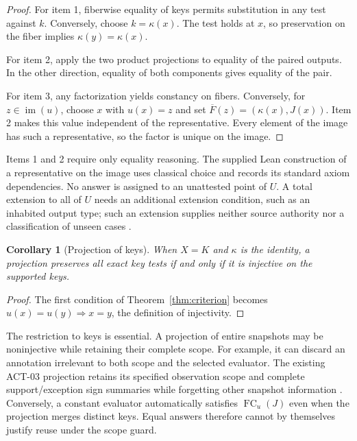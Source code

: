 \documentclass[11pt]{article}
\newtheorem{corollary}[theorem]{Corollary}
\newcommand{\FC}{\operatorname{FC}}
\newcommand{\im}{\operatorname{im}}
\begin{document}
\begin{proof}
For item 1, fiberwise equality of keys permits substitution in any test against \(k\). Conversely, choose \(k=\kappa(x)\). The test holds at \(x\), so preservation on the fiber implies \(\kappa(y)=\kappa(x)\).

For item 2, apply the two product projections to equality of the paired outputs. In the other direction, equality of both components gives equality of the pair.

For item 3, any factorization yields constancy on fibers. Conversely, for \(z\in\im(u)\), choose \(x\) with \(u(x)=z\) and set \(\overline F(z)=(\kappa(x),J(x))\). Item 2 makes this value independent of the representative. Every element of the image has such a representative, so the factor is unique on the image.
\end{proof}

Items 1 and 2 require only equality reasoning. The supplied Lean construction of a representative on the image uses classical choice and records its standard axiom dependencies. No answer is assigned to an unattested point of \(U\). A total extension to all of \(U\) needs an additional extension condition, such as an inhabited output type; such an extension supplies neither source authority nor a classification of unseen cases \cite{factor}.

\begin{corollary}[Projection of keys]\label{cor:keys}
When \(X=K\) and \(\kappa\) is the identity, a projection preserves all exact key tests if and only if it is injective on the supported keys.
\end{corollary}

\begin{proof}
The first condition of Theorem~\ref{thm:criterion} becomes
\(u(x)=u(y)\Rightarrow x=y\), the definition of injectivity.
\end{proof}

The restriction to keys is essential. A projection of entire snapshots may be noninjective while retaining their complete scope. For example, it can discard an annotation irrelevant to both scope and the selected evaluator. The existing ACT-03 projection retains its specified observation scope and complete support/exception sign summaries while forgetting other snapshot information \cite{projection}. Conversely, a constant evaluator automatically satisfies \(\FC_u(J)\) even when the projection merges distinct keys. Equal answers therefore cannot by themselves justify reuse under the scope guard.
\end{document}
